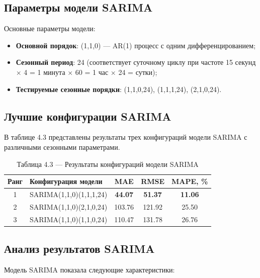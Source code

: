 \subsection{Параметры модели SARIMA}

\hspace*{1.25cm}Основные параметры модели:
\begin{itemize}
	\item \textbf{Основной порядок}: (1,1,0) --- AR(1) процесс с одним дифференцированием;
	\item \textbf{Сезонный период}: 24 (соответствует суточному циклу при частоте 15 секунд $\times$ 4 = 1 минута $\times$ 60 = 1 час $\times$ 24 = сутки);
	\item \textbf{Тестируемые сезонные порядки}: (1,1,0,24), (1,1,1,24), (2,1,0,24).
\end{itemize}

\subsection{Лучшие конфигурации SARIMA}

\hspace*{1.25cm}В таблице 4.3 представлены результаты трех конфигураций модели SARIMA с различными сезонными параметрами.

\begin{table}[H]
	\centering
	\caption*{Таблица 4.3 --- Результаты конфигураций модели SARIMA}
	\begin{tabular}{|c|p{8cm}|c|c|c|}
		\hline
		\textbf{Ранг} & \textbf{Конфигурация модели} & \textbf{MAE} & \textbf{RMSE} & \textbf{MAPE, \%} \\
		\hline
		1 & SARIMA(1,1,0)(1,1,1,24) & \textbf{44.07} & \textbf{51.37} & \textbf{11.06} \\
		\hline
		2 & SARIMA(1,1,0)(2,1,0,24) & 103.76 & 121.92 & 25.50 \\
		\hline
		3 & SARIMA(1,1,0)(1,1,0,24) & 110.47 & 131.78 & 26.76 \\
		\hline
	\end{tabular}
	\label{tab:sarima_results}
\end{table}

\subsection{Анализ результатов SARIMA}

\hspace*{1.25cm}Модель SARIMA показала следующие характеристики:


